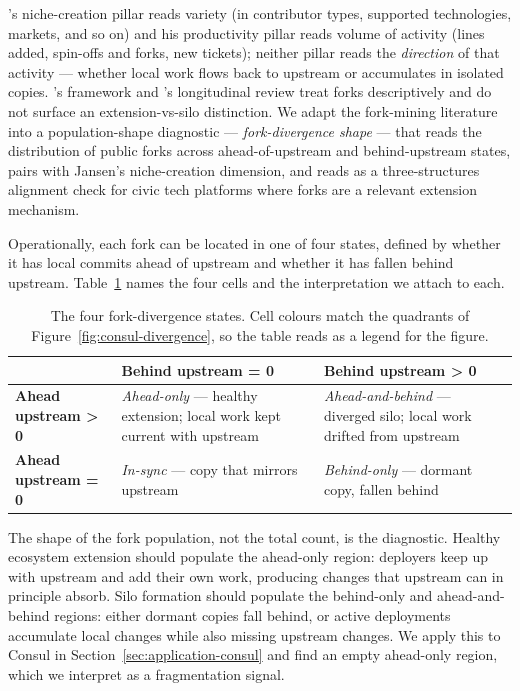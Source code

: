 \documentclass[11pt,a4paper]{article}
\begin{document}
\citet{jansen2014measuring}'s niche-creation pillar reads variety (in contributor types, supported technologies, markets, and so on) and his productivity pillar reads volume of activity (lines added, spin-offs and forks, new tickets); neither pillar reads the \emph{direction} of that activity --- whether local work flows back to upstream or accumulates in isolated copies. \citet{manikas2013systematic}'s framework and \citet{manikas2016revisiting}'s longitudinal review treat forks descriptively and do not surface an extension-vs-silo distinction. We adapt the fork-mining literature into a population-shape diagnostic --- \emph{fork-divergence shape} --- that reads the distribution of public forks across ahead-of-upstream and behind-upstream states, pairs with Jansen's niche-creation dimension, and reads as a three-structures alignment check for civic tech platforms where forks are a relevant extension mechanism.

Operationally, each fork can be located in one of four states, defined by whether it has local commits ahead of upstream and whether it has fallen behind upstream. Table~\ref{tab:fork-states} names the four cells and the interpretation we attach to each.

\begin{table}[!htbp]
\centering
\caption{The four fork-divergence states. Cell colours match the quadrants of Figure~\ref{fig:consul-divergence}, so the table reads as a legend for the figure.}
\label{tab:fork-states}
\renewcommand{\arraystretch}{1.5}
\begin{tabularx}{\textwidth}{l X X}
\toprule
 & \textbf{Behind upstream = 0} & \textbf{Behind upstream > 0} \\
\midrule
\textbf{Ahead upstream > 0} &
\cellcolor{quadgreen}\emph{Ahead-only} --- healthy extension; local work kept current with upstream &
\cellcolor{quadred}\emph{Ahead-and-behind} --- diverged silo; local work drifted from upstream \\
\midrule
\textbf{Ahead upstream = 0} &
\cellcolor{quadgray}\emph{In-sync} --- copy that mirrors upstream &
\cellcolor{quadtan}\emph{Behind-only} --- dormant copy, fallen behind \\
\bottomrule
\end{tabularx}
\end{table}

The shape of the fork population, not the total count, is the diagnostic. Healthy ecosystem extension should populate the ahead-only region: deployers keep up with upstream and add their own work, producing changes that upstream can in principle absorb. Silo formation should populate the behind-only and ahead-and-behind regions: either dormant copies fall behind, or active deployments accumulate local changes while also missing upstream changes. We apply this to Consul in Section~\ref{sec:application-consul} and find an empty ahead-only region, which we interpret as a fragmentation signal.
\end{document}
